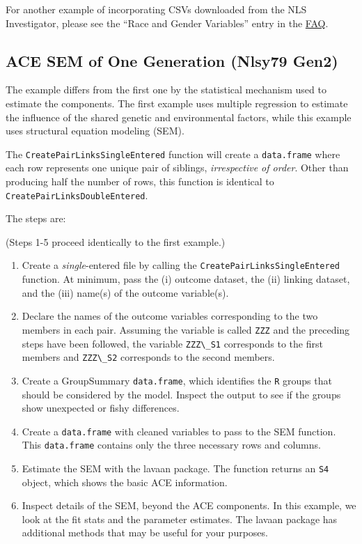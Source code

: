 \documentclass[smallextended]{svjour3}       %
\providecommand{\tightlist}{%
  \setlength{\itemsep}{0pt}\setlength{\parskip}{0pt}}
\begin{document}
For another example of incorporating CSVs downloaded from the NLS
Investigator, please see the ``Race and Gender Variables'' entry in the
\href{https://nlsy-links.github.io/NlsyLinks/articles/faq.html}{FAQ}.

\hypertarget{ace-sem-of-one-generation-nlsy79-gen2}{%
\subsection{ACE SEM of One Generation (Nlsy79
Gen2)}\label{ace-sem-of-one-generation-nlsy79-gen2}}

The example differs from the first one by the statistical mechanism used
to estimate the components. The first example uses multiple regression
to estimate the influence of the shared genetic and environmental
factors, while this example uses structural equation modeling (SEM).

The \texttt{CreatePairLinksSingleEntered} function will create a
\texttt{data.frame} where each row represents one unique pair of
siblings, \emph{irrespective of order}. Other than producing half the
number of rows, this function is identical to
\texttt{CreatePairLinksDoubleEntered}.

The steps are:

(Steps 1-5 proceed identically to the first example.)

\begin{enumerate}
\def\labelenumi{\arabic{enumi}.}
\setcounter{enumi}{5}
\tightlist
\item
  Create a \emph{single}-entered file by calling the
  \texttt{CreatePairLinksSingleEntered} function. At minimum, pass the
  (i) outcome dataset, the (ii) linking dataset, and the (iii) name(s)
  of the outcome variable(s).
\item
  Declare the names of the outcome variables corresponding to the two
  members in each pair. Assuming the variable is called \texttt{ZZZ} and
  the preceding steps have been followed, the variable
  \texttt{ZZZ\textbackslash{}\_S1} corresponds to the first members and
  \texttt{ZZZ\textbackslash{}\_S2} corresponds to the second members.
\item
  Create a GroupSummary \texttt{data.frame}, which identifies the
  \texttt{R} groups that should be considered by the model. Inspect the
  output to see if the groups show unexpected or fishy differences.
\item
  Create a \texttt{data.frame} with cleaned variables to pass to the SEM
  function. This \texttt{data.frame} contains only the three necessary
  rows and columns.
\item
  Estimate the SEM with the lavaan package. The function returns an
  \texttt{S4} object, which shows the basic ACE information.
\item
  Inspect details of the SEM, beyond the ACE components. In this
  example, we look at the fit stats and the parameter estimates. The
  lavaan package has additional methods that may be useful for your
  purposes.
\end{enumerate}
\end{document}
